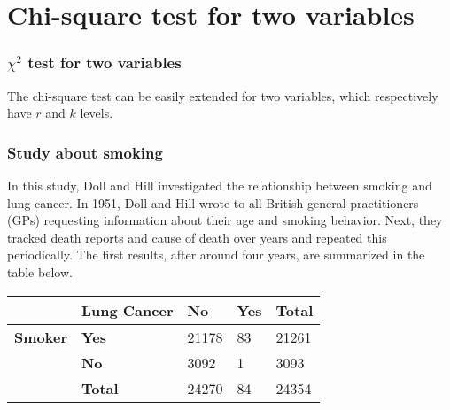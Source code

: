 \documentclass[aspectratio=169]{beamer}
\begin{document}
\section{Chi-square test for two variables}

\begin{frame}
  \frametitle{$\chi^{2}$ test for two variables}
  The chi-square test can be easily extended for two variables, which respectively have $r$ and $k$ levels.
\end{frame}

\begin{frame}
  \frametitle{Study about smoking}
  In this study, Doll and Hill investigated the relationship between smoking and lung cancer. In 1951, Doll and Hill wrote to all British general practitioners (GPs) requesting information about their age and smoking behavior. Next, they tracked death reports and cause of death over years and repeated this periodically. The first results, after around four years, are summarized in the table below.  
  
  \begin{table}[h]
    \begin{tabular}{@{}lllll@{}}
      \toprule
      & \textbf{Lung Cancer} & \textbf{No} & \textbf{Yes} & \textbf{Total} \\ \midrule
      \textbf{Smoker} & \textbf{Yes}        & 21178         & 83           & 21261           \\
                      & \textbf{No}         & 3092          & 1            & 3093            \\
                      & \textbf{Total}      & 24270         & 84           & 24354           \\ \bottomrule
    \end{tabular}
  \end{table}
\end{frame}
\end{document}
